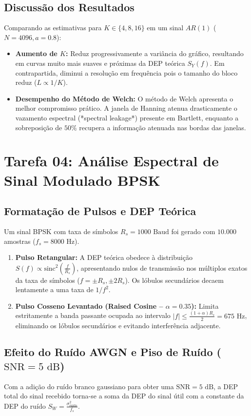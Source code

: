 \documentclass[12pt,a4paper]{article}
\begin{document}
\subsection{Discussão dos Resultados}
Comparando as estimativas para $K \in \{4, 8, 16\}$ em um sinal $AR(1)$ ($N=4096, a=0.8$):
\begin{itemize}
    \item \textbf{Aumento de $K$:} Reduz progressivamente a variância do gráfico, resultando em curvas muito mais suaves e próximas da DEP teórica $S_Y(f)$. Em contrapartida, diminui a resolução em frequência pois o tamanho do bloco reduz ($L \propto 1/K$).
    \item \textbf{Desempenho do Método de Welch:} O método de Welch apresenta o melhor compromisso prático. A janela de Hanning atenua drasticamente o vazamento espectral (*spectral leakage*) presente em Bartlett, enquanto a sobreposição de $50\%$ recupera a informação atenuada nas bordas das janelas.
\end{itemize}

\section{Tarefa 04: Análise Espectral de Sinal Modulado BPSK}

\subsection{Formatação de Pulsos e DEP Teórica}
Um sinal BPSK com taxa de símbolos $R_s = 1000 \text{ Baud}$ foi gerado com $10.000$ amostras ($f_s = 8000 \text{ Hz}$).
\begin{enumerate}
    \item \textbf{Pulso Retangular:} A DEP teórica obedece à distribuição $S(f) \propto \text{sinc}^2\left(\frac{f}{R_s}\right)$, apresentando nulos de transmissão nos múltiplos exatos da taxa de símbolos ($f = \pm R_s, \pm 2R_s$). Os lóbulos secundários decaem lentamente a uma taxa de $1/f^2$.
    \item \textbf{Pulso Cosseno Levantado (Raised Cosine -- $\alpha=0.35$):} Limita estritamente a banda passante ocupada ao intervalo $|f| \le \frac{(1+\alpha)R_s}{2} = 675 \text{ Hz}$, eliminando os lóbulos secundários e evitando interferência adjacente.
\end{enumerate}

\subsection{Efeito do Ruído AWGN e Piso de Ruído ($\text{SNR} = 5\text{ dB}$)}
Com a adição do ruído branco gaussiano para obter uma $\text{SNR} = 5\text{ dB}$, a DEP total do sinal recebido torna-se a soma da DEP do sinal útil com a constante da DEP do ruído $S_W = \frac{\sigma_{\text{ruído}}^2}{f_s}$.
\end{document}
